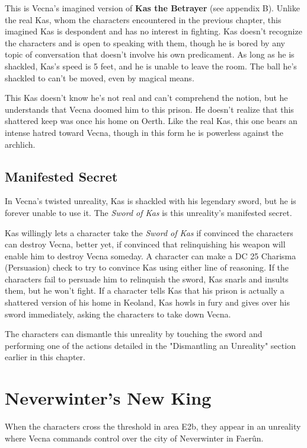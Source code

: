 \documentclass[10pt,a4paper,twoside,bg=print,twocolumn,openany,nodeprecatedcode]{dndbook}
\begin{document}
This is Vecna's imagined version of \textbf{Kas the Betrayer} (see appendix B). Unlike the real Kas, whom the characters encountered in the previous chapter, this imagined Kas is despondent and has no interest in fighting. Kas doesn't recognize the characters and is open to speaking with them, though he is bored by any topic of conversation that doesn't involve his own predicament. As long as he is shackled, Kas's speed is 5 feet, and he is unable to leave the room. The ball he's shackled to can't be moved, even by magical means.

This Kas doesn't know he's not real and can't comprehend the notion, but he understands that Vecna doomed him to this prison. He doesn't realize that this shattered keep was once his home on Oerth. Like the real Kas, this one bears an intense hatred toward Vecna, though in this form he is powerless against the archlich.

\subsection{Manifested Secret}
In Vecna's twisted unreality, Kas is shackled with his legendary sword, but he is forever unable to use it. The \textit{Sword of Kas} is this unreality's manifested secret.

Kas willingly lets a character take the \textit{Sword of Kas} if convinced the characters can destroy Vecna, better yet, if convinced that relinquishing his weapon will enable him to destroy Vecna someday. A character can make a DC 25 Charisma (Persuasion) check to try to convince Kas using either line of reasoning. If the characters fail to persuade him to relinquish the sword, Kas snarls and insults them, but he won't fight. If a character tells Kas that his prison is actually a shattered version of his home in Keoland, Kas howls in fury and gives over his sword immediately, asking the characters to take down Vecna.

The characters can dismantle this unreality by touching the sword and performing one of the actions detailed in the "Dismantling an Unreality" section earlier in this chapter.

\section{Neverwinter's New King}
When the characters cross the threshold in area E2b, they appear in an unreality where Vecna commands control over the city of Neverwinter in Faerûn.
\end{document}
